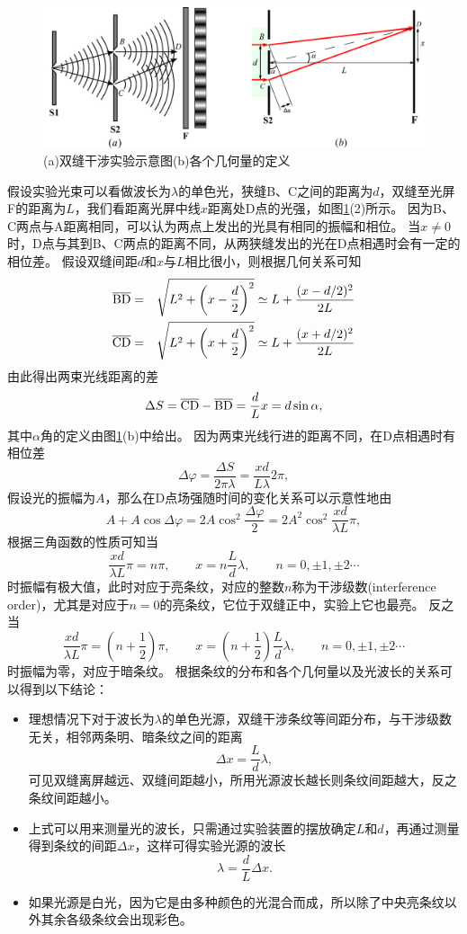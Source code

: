 \begin{figure}
\centering
\includegraphics[width=0.7\linewidth]{images/wave-optics-2}
\caption{(a)双缝干涉实验示意图(b)各个几何量的定义}
\label{fig:wave-optics-2}
\end{figure}

假设实验光束可以看做波长为$\lambda$的单色光，狭缝B、C之间的距离为$d$，双缝至光屏F的距离为$L$，我们看距离光屏中线$x$距离处D点的光强，如图\ref{fig:wave-optics-2}(2)所示。
因为B、C两点与A距离相同，可以认为两点上发出的光具有相同的振幅和相位。
当$x\neq 0$时，D点与其到B、C两点的距离不同，从两狭缝发出的光在D点相遇时会有一定的相位差。
假设双缝间距$d$和$x$与$L$相比很小，则根据几何关系可知
\begin{eqnarray*}
\overline{\rm BD}& =& \sqrt{L^2+\left(x-\frac{d}{2}\right)^2}\simeq L + \frac{(x-d/2)^2}{2L}\\
\overline{\rm CD}& =& \sqrt{L^2+\left(x+\frac{d}{2}\right)^2}\simeq L + \frac{(x+d/2)^2}{2L}
\end{eqnarray*}
由此得出两束光线距离的差
\[
\Delta S = \overline{\rm CD}-\overline{\rm BD} = \frac{d}{L}x = d\sin\alpha,
\]
其中$\alpha$角的定义由图\ref{fig:wave-optics-2}(b)中给出。
因为两束光线行进的距离不同，在D点相遇时有相位差
\[\Delta\varphi = \frac{\Delta S}{2\pi\lambda} = \frac{xd}{ L\lambda}2\pi,\]
假设光的振幅为$A$，那么在D点场强随时间的变化关系可以示意性地由
\[
A+A\cos\Delta\varphi = 2A\cos^2\frac{\Delta \varphi}{2} = 2A^2\cos^2\frac{xd}{\lambda L}\pi,
\]
根据三角函数的性质可知当
\[ \frac{xd}{\lambda L}\pi = n\pi,\qquad x = n\frac{L}{d}\lambda,\qquad n = 0,\pm 1,\pm 2\cdots \]
时振幅有极大值，此时对应于亮条纹，对应的整数$n$称为{\heiti 干涉级数}(interference order)，尤其是对应于$n=0$的亮条纹，它位于双缝正中，实验上它也最亮。
反之当
\[ \frac{xd}{\lambda L}\pi = (n+\frac{1}{2})\pi,\qquad x =(n+\frac{1}{2})\frac{L}{d}\lambda,\qquad n = 0,\pm 1,\pm 2\cdots \]
时振幅为零，对应于暗条纹。
根据条纹的分布和各个几何量以及光波长的关系可以得到以下结论：
\begin{itemize}
\item 理想情况下对于波长为$\lambda$的单色光源，双缝干涉条纹等间距分布，与干涉级数无关，相邻两条明、暗条纹之间的距离
\begin{equation}
\Delta x = \frac{L}{d}\lambda,
\end{equation}
可见双缝离屏越远、双缝间距越小，所用光源波长越长则条纹间距越大，反之条纹间距越小。
\item
上式可以用来测量光的波长，只需通过实验装置的摆放确定$L$和$d$，再通过测量得到条纹的间距$\Delta x$，这样可得实验光源的波长
\begin{equation}
\lambda = \frac{d}{L}\Delta x.
\end{equation}
\item 
如果光源是白光，因为它是由多种颜色的光混合而成，所以除了中央亮条纹以外其余各级条纹会出现彩色。
\end{itemize}

